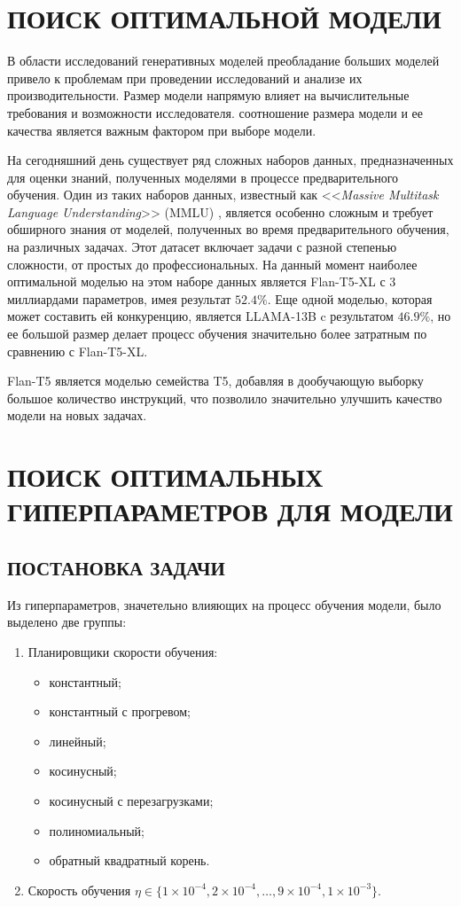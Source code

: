 \section{ПОИСК ОПТИМАЛЬНОЙ МОДЕЛИ}
В области исследований генеративных моделей преобладание больших моделей привело к проблемам при проведении исследований и анализе их производительности. Размер модели напрямую влияет на вычислительные требования и возможности исследователя. соотношение размера модели и ее качества является важным фактором при выборе модели.

На сегодняшний день существует ряд сложных наборов данных, предназначенных для оценки знаний, полученных моделями в процессе предварительного обучения. Один из таких наборов данных, известный как <<\textit{Massive Multitask Language Understanding}>> (MMLU) \cite{MMLU-bench}, является особенно сложным и требует обширного знания от моделей, полученных во время предварительного обучения, на различных задачах. Этот датасет включает задачи с разной степенью сложности, от простых до профессиональных. На данный момент наиболее оптимальной моделью на этом наборе данных является Flan-T5-XL с 3 миллиардами параметров, имея результат $52.4\%$. Еще одной моделью, которая может составить ей конкуренцию, является LLAMA-13B c результатом $46.9\%$, но ее большой размер делает процесс обучения значительно более затратным по сравнению с Flan-T5-XL.

Flan-T5 является моделью семейства T5, добавляя в дообучающую выборку большое количество инструкций, что позволило значительно улучшить качество модели на новых задачах.

\section{ПОИСК ОПТИМАЛЬНЫХ ГИПЕРПАРАМЕТРОВ ДЛЯ МОДЕЛИ}
\subsection{ПОСТАНОВКА ЗАДАЧИ}

Из гиперпараметров, значетельно влияющих на процесс обучения модели, было выделено две группы:
\begin{enumerate}
  \item Планировщики скорости обучения:
        \begin{itemize}
          \item константный;
          \item константный с прогревом;
          \item линейный;
          \item косинусный;
          \item косинусный с перезагрузками;
          \item полиномиальный;
          \item обратный квадратный корень.
        \end{itemize}
  \item Скорость обучения $\eta \in \{1 \times 10^{-4}, 2 \times 10^{-4}, \ldots, 9 \times 10^{-4}, 1 \times 10^{-3}\}$.
\end{enumerate}


